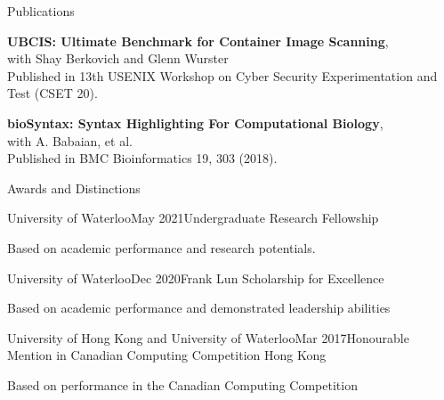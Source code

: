 \documentclass{cv}
\begin{document}
\begin{rSection}{Publications}
\begin{rSubsectionPure}
	\item \textbf{{UBCIS}: Ultimate Benchmark for Container Image Scanning}, \\
	with Shay Berkovich and Glenn Wurster \\
	Published in 13th {USENIX} Workshop on Cyber Security Experimentation and Test ({CSET} 20). 
\end{rSubsectionPure}

\begin{rSubsectionPure}
	\item \textbf{bioSyntax: Syntax Highlighting For Computational Biology}, \\
	with A. Babaian, et al. \\
	Published in BMC Bioinformatics 19, 303 (2018). 
\end{rSubsectionPure}
\end{rSection}


\begin{rSection}{Awards and Distinctions}
\begin{rSubsection}{University of Waterloo}{May 2021}{Undergraduate Research Fellowship}{}
	\item Based on academic performance and research potentials.
\end{rSubsection}

\begin{rSubsection}{University of Waterloo}{Dec 2020}{Frank Lun Scholarship for Excellence}{}
	\item Based on academic performance and demonstrated leadership abilities
\end{rSubsection}



\begin{rSubsection}{University of Hong Kong and University of Waterloo}{Mar 2017}{Honourable Mention in Canadian Computing Competition Hong Kong}{}
	\item Based on performance in the Canadian Computing Competition 
\end{rSubsection}
\end{rSection}
\end{document}
